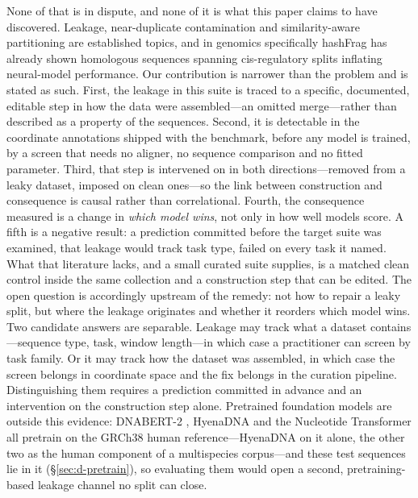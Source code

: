 \documentclass[webpdf,modern,large,namedate]{oup-authoring-template}%
\begin{document}
None of that is in dispute, and none of it is what this paper claims to have discovered. Leakage, near-duplicate contamination and similarity-aware partitioning are established topics, and in genomics specifically hashFrag \citep{rafi2026} has already shown homologous sequences spanning cis-regulatory splits inflating neural-model performance. Our contribution is narrower than the problem and is stated as such. First, the leakage in this suite is traced to a specific, documented, editable step in how the data were assembled---an omitted merge---rather than described as a property of the sequences. Second, it is detectable in the coordinate annotations shipped with the benchmark, before any model is trained, by a screen that needs no aligner, no sequence comparison and no fitted parameter. Third, that step is intervened on in both directions---removed from a leaky dataset, imposed on clean ones---so the link between construction and consequence is causal rather than correlational. Fourth, the consequence measured is a change in \emph{which model wins}, not only in how well models score. A fifth is a negative result: a prediction committed before the target suite was examined, that leakage would track task type, failed on every task it named. What that literature lacks, and a small curated suite supplies, is a matched clean control inside the same collection and a construction step that can be edited. The open question is accordingly upstream of the remedy: not how to repair a leaky split, but where the leakage originates and whether it reorders which model wins. Two candidate answers are separable. Leakage may track what a dataset contains---sequence type, task, window length---in which case a practitioner can screen by task family. Or it may track how the dataset was assembled, in which case the screen belongs in coordinate space and the fix belongs in the curation pipeline. Distinguishing them requires a prediction committed in advance and an intervention on the construction step alone. Pretrained foundation models are outside this evidence: DNABERT-2 \citep{zhou2023dnabert2}, HyenaDNA \citep{nguyen2023hyenadna} and the Nucleotide Transformer \citep{dallatorre2024nucleotide} all pretrain on the GRCh38 human reference---HyenaDNA on it alone, the other two as the human component of a multispecies corpus---and these test sequences lie in it (\S\ref{sec:d-pretrain}), so evaluating them would open a second, pretraining-based leakage channel no split can close.
\end{document}
